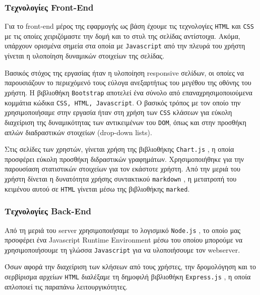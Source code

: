 \documentclass[acmtog, nonacm, language=english, language=greek]{acmart}
\newcommand{\en}[1]{\textlatin{#1}}
\newcommand{\src}[1]{\texttt{\en{#1}}}
\begin{document}
\subsubsection{Τεχνολογίες \en{Front-End}}

Για το \en{front-end} μέρος της εφαρμογής ως βάση έχουμε τις τεχνολογίες
\src{HTML} και \src{CSS} με τις οποίες χειριζόμαστε την δομή και το στυλ της
σελίδας αντίστοιχα. Ακόμα, υπάρχουν ορισμένα σημεία στα οποία με
\src{Javascript} από την πλευρά του χρήστη γίνεται η υλοποίηση δυναμικών
στοιχείων της σελίδας. 

Βασικός στόχος της εργασίας ήταν η υλοποίηση \en{responsive} σελίδων, οι οποίες
να παρουσιάζουν το περιεχόμενό τους εύλογα ανεξαρτήτως του μεγέθου της οθόνης
του χρήστη. Η βιβλιοθήκη \src{Bootstrap} \cite{Bootstrap} αποτελεί ένα σύνολο
από επαναχρησιμοποιούμενα κομμάτια κώδικα \src{CSS, HTML, Javascript}. Ο
βασικός τρόπος με τον οποίο την χρησιμοποιήσαμε στην εργασία ήταν στη χρήση των
\src{CSS} κλάσεων για εύκολη διαχείριση της δυναμικότητας των αντικειμένων του
\src{DOM}, όπως και στην προσθήκη απλών διαδραστικών στοιχείων \en{(drop-down
lists)}.

Στις σελίδες των χρηστών, γίνεται χρήση της βιβλιοθήκης \src{Chart.js}
\cite{ChartJS}, η οποία προσφέρει εύκολη προσθήκη διδραστικών γραφημάτων.
Χρησιμοποιήθηκε για την παρουσίαση στατιστικών στοιχείων για τον εκάστοτε
χρήστη. Από την μεριά του χρήστη δίνεται η δυνατότητα χρήσης συντακτικού
\src{markdown} \cite{Markdown}, η μετατροπή του κειμένου αυτού σε \src{HTML}
γίνεται μέσω της βιβλιοθήκης \src{marked}. \cite{Marked}

\subsubsection{Τεχνολογίες \en{Back-End}}

Από τη μεριά του \en{server} χρησιμοποιήσαμε
το λογισμικό \src{Node.js} \cite{Node.js}, 
το οποίο μας πρσοφέρει ένα \en{Javascript Runtime Environment} μέσω 
του οποίου μπορούμε να χρησιμοποιήσουμε τη γλώσσα \src{Javascript} 
για να υλοποιήσουμε τον \en{webserver}.

Όσων αφορά την διαχείριση των κλήσεων από τους χρήστες, την δρομολόγηση 
και το σερβίρισμα αρχείων \src{HTML} διαλέξαμε τη δημοφιλή 
βιβλιοθήκη \src{Express.js} \cite{Express}, η οποία απλοποιεί 
τις παραπάνω λειτουργικότητες. 
\end{document}
